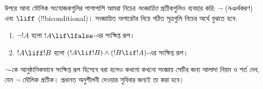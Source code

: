 \documentclass[../../../include/open-logic-section]{subfiles}
\begin{document}
উপরে আনা মৌলিক সংযোজকগুলির পাশাপাশি আমরা নিচের \emph{সংজ্ঞায়িত}
প্রতীকগুলিও ব্যবহার করি: $\lnot$ (নঞর্থকরণ) এবং $\liff$
(!!{biconditional})। সংজ্ঞায়িত অপারেটর দিয়ে গঠিত সূত্রগুলি নিচের
অর্থে বুঝতে হবে:
\begin{enumerate}
\item $\lnot !A$ হলো $!A \lif \lfalse$-এর সংক্ষিপ্ত রূপ।

\item $!A \liff !B$ হলো $(!A \lif !B) \land (!B
  \lif !A)$-এর সংক্ষিপ্ত রূপ।
\end{enumerate}

$\lnot$-কে আনুষ্ঠানিকভাবে সংক্ষিপ্ত রূপ হিসেবে ধরা হলেও কখনো
কখনো সংজ্ঞায় সেটির জন্য আলাদা নিয়ম ও শর্ত দেব, যেন $\lnot$ মৌলিক
প্রতীক। প্রধানত অনুশীলনী দেওয়ার সুবিধার জন্যই তা করা হবে।
\end{document}
